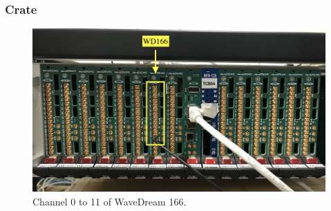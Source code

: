 \begin{frame} [fragile]
\small
	\frametitle{Crate}
    		\begin{figure}
		 \centering
			\includegraphics[scale=0.3]{photos/im2.png}
			\caption{Channel 0 to 11 of WaveDream 166.}
		\end{figure}  
\end{frame}